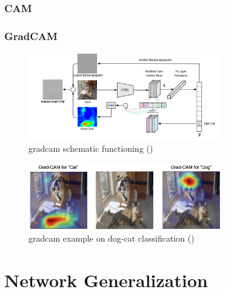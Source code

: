 \subsubsection{CAM}

\subsubsection{GradCAM}
\label{subsec:gradcam-theory}

\cite{Selvaraju_2019}

\begin{figure}[!htb]
	\centering
	\includegraphics[width=0.75\textwidth]{"contents/images/gradcam/02-gradcam-schema"}
	\caption[\gls{gradcam} schematic functioning]{\gls{gradcam} schematic functioning (\cite{Selvaraju_2019})}
	\label{fig:gradcam-schema}
\end{figure}

\begin{figure}[!htb]
\centering
\includegraphics[width=0.75\textwidth]{"contents/images/gradcam/02-gradcam-catdog"}
\caption[\gls{gradcam} example on dog-cat classification]{\gls{gradcam} example on dog-cat classification (\cite{Selvaraju_2019})}
\label{fig:gradcam-catdog}
\end{figure}





\section{Network Generalization}
\label{sec:network-generalization}





